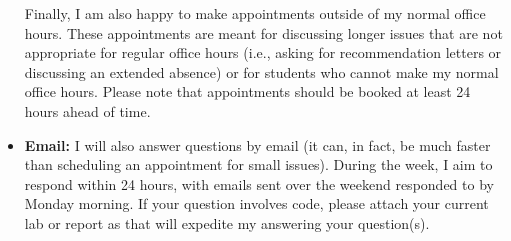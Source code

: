 \documentclass[12pt]{article}
\begin{document}
\begin{itemize}
Finally, I am also happy to make appointments outside of my normal
office hours. These appointments are meant for discussing
longer issues that are not appropriate for regular office hours (i.e., asking
for recommendation letters or discussing an extended absence) or for students
who cannot make my normal office hours. Please note that appointments should
be booked at least 24 hours ahead of time.
\item \textbf{Email:} I will also answer questions by email (it can, in fact,
be much faster than scheduling an appointment for small issues). During the
week, I aim to respond within 24 hours, with emails sent over the weekend
responded to by Monday morning. If your question involves code, please attach
your current lab or report as that will expedite my answering your question(s).
\end{itemize}








\end{document}
